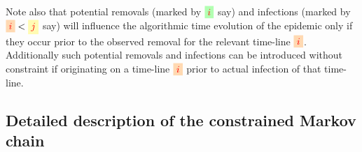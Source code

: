 \documentclass[]{article}
\newcommand{\target}{{\colorbox{green!30}{$\textcolor{red}{i}$}}}
\newcommand{\infectee}{{\colorbox{yellow!30}{$\textcolor{red}{j}$}}}
\newcommand{\infector}{{\colorbox{orange!30}{$\textcolor{red}{i}$}}}
\begin{document}
Note also that potential removals 
(marked by \(\target\) say)
and infections 
(marked by \(\infector<\infectee\) say)
will influence the algorithmic time evolution of the epidemic
only if they occur prior to 
the observed removal for the 
relevant time-line \(\infector\).
Additionally such potential removals and
infections can be introduced without constraint
if originating on a time-line \(\infector\) prior to
actual infection of that time-line.


\subsection{Detailed description of the constrained Markov chain}\label{ssec:evolution}
\end{document}
